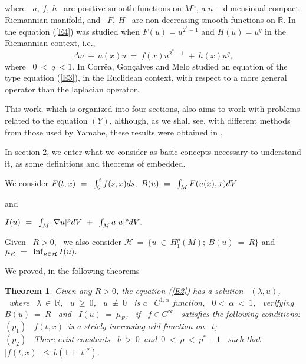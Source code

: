 \documentclass[12pt]{article}
\newtheorem{theorem}{Theorem}[section]
\begin{document}
{\noindent} where \ $a, \ f, \ h$ \  are positive smooth functions on $M^n$, a $n-$dimensional compact Riemannian manifold,
 and \ $ F, \ H$ 
\ are non-decreasing smooth functions on $\mathbb{R}$.  In \cite{djadli} the equation (\ref{E4}) was studied when
$F(u)=u^{2^{\ast}-1} $ and $H(u)=u^q$ in the Riemannian context, i.e.,
\begin{equation}
\label{E3}
\Delta u \ + \ a(x)u \ = \ f(x)u^{2^{\ast}-1} \ + \ h(x)u^q, 
\end{equation}
{\noindent} where \ $0 \ < \ q \ < 1$. In \cite{correa} Corr\^ea,  Gon\c{c}alves and Melo  studied
an equation of the type equation (\ref{E3}),  in the Euclidean context,  with respect to a more general operator than the 
laplacian operator.

This work, which is organized into four sections, also aims to work with problems related to the equation 
$ (Y) $, although, as we shall see, with different methods from those used by Yamabe, these results were obtained in \cite{silva}, 

In section 2, we enter what we consider as basic concepts necessary to understand it, as some definitions and theorems of embedded.

\noindent We consider
$F(t,x) \ = \ {\displaystyle}\int^{t}_0{f(s,x)ds},$  
$B(u)\ = \ {\displaystyle}\int_M{F(u(x),x)dV}$ 

\noindent and

$I(u)\ =\ {\displaystyle}\int_M{|\nabla u|^pdV}\ +\ {\displaystyle}\int_M{a|u|^pdV}.$

\noindent Given \ $R > 0$, \  we also consider 
$\mathcal{H} \ = \ \{u \ \in \ H^p_1(M);\  B(u)\ = \ R \}$
  and 
$\mu_R \ = \ {\displaystyle}\inf_{u \in \mathcal{H}}{I(u)}.$

We proved, in the following theorems
\begin{theorem}
Given any  $R > 0$, the equation (\ref{E2})  has a solution   \ $(\lambda,u)$, \ where \ $\lambda \ \in 
\ \mathbb{R}$, \ $u \ \geq \ 0$, \ $u \ \not\equiv \ 0$ \ is a \ $C^{1,\alpha}$ function, \ $0 < \ \alpha \ < \  1$,
\ verifying \ $B(u) \ = \ R$ \ and \ $I(u)\ = \ \mu_R$, \ if \ $f \in C^{\infty}$ \ satisfies the following conditions: \\
$(p_1)$ \ $f(t,x)$\ is a stricly increasing odd function on \ $t$; \\
$(p_2)$ \ There exist constants \ $b \ >\ 0$\ and\ $0\ <\ \rho  \ <\ p^{\ast} - 1$ \ such that
 \ $|f(t,x)|\ \leq \ b\left(1 + |t|^{\rho}\right)$.
\end{theorem}
\end{document}
